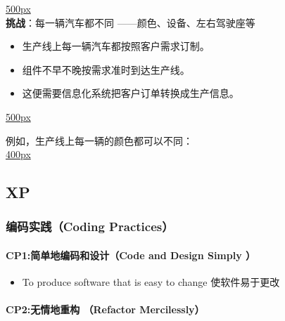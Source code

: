 \documentclass[]{article}
\providecommand{\tightlist}{%
  \setlength{\itemsep}{0pt}\setlength{\parskip}{0pt}}
\let\oldparagraph\paragraph
\renewcommand{\paragraph}[1]{\oldparagraph{#1}\mbox{}}
\begin{document}
\href{文件:NissanRobots-OIP.h8UAC7FBjlaCmA_mBepJjQHaEi.jpg}{500px}\\
\textbf{挑战}：每一辆汽车都不同 ------颜色、设备、左右驾驶座等

\begin{itemize}
\tightlist
\item
  生产线上每一辆汽车都按照客户需求订制。
\item
  组件不早不晚按需求准时到达生产线。
\item
  这便需要信息化系统把客户订单转换成生产信息。
\end{itemize}

\href{文件:NissanJIT_OIP.RQGKy67DWGTu-DQiOCqW2gHaEK.jpg}{500px}

例如，生产线上每一辆的颜色都可以不同：\\
\href{文件:NissanProdLineOIP.wJFmfMl7q2_V8JaQi4kQ8QHaE6.jpg}{400px}\\

\hypertarget{xp}{%
\subsection{XP}\label{xp}}

\hypertarget{ux7f16ux7801ux5b9eux8df5coding-practices}{%
\subsubsection{编码实践（Coding
Practices）}\label{ux7f16ux7801ux5b9eux8df5coding-practices}}

\hypertarget{cp1ux7b80ux5355ux5730ux7f16ux7801ux548cux8bbeux8ba1code-and-design-simply}{%
\paragraph{CP1:简单地编码和设计（Code and Design Simply
）}\label{cp1ux7b80ux5355ux5730ux7f16ux7801ux548cux8bbeux8ba1code-and-design-simply}}

\begin{itemize}
\tightlist
\item
  To produce software that is easy to change 使软件易于更改
\end{itemize}

\hypertarget{cp2ux65e0ux60c5ux5730ux91cdux6784-refactor-mercilessly}{%
\paragraph{CP2:无情地重构 （Refactor
Mercilessly）}\label{cp2ux65e0ux60c5ux5730ux91cdux6784-refactor-mercilessly}}
\end{document}
